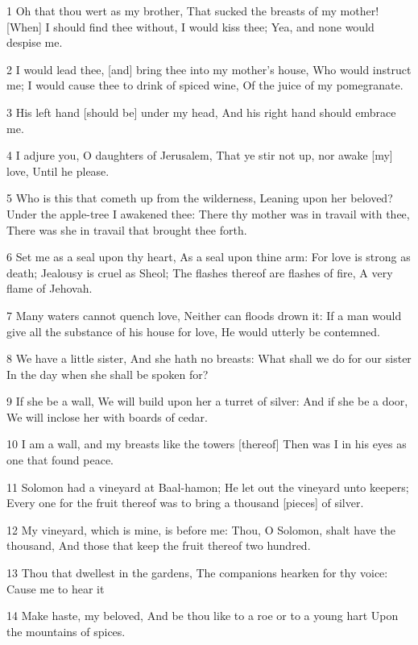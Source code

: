 \par 1 Oh that thou wert as my brother, That sucked the breasts of my mother! [When] I should find thee without, I would kiss thee; Yea, and none would despise me.
\par 2 I would lead thee, [and] bring thee into my mother's house, Who would instruct me; I would cause thee to drink of spiced wine, Of the juice of my pomegranate.
\par 3 His left hand [should be] under my head, And his right hand should embrace me.
\par 4 I adjure you, O daughters of Jerusalem, That ye stir not up, nor awake [my] love, Until he please.
\par 5 Who is this that cometh up from the wilderness, Leaning upon her beloved? Under the apple-tree I awakened thee: There thy mother was in travail with thee, There was she in travail that brought thee forth.
\par 6 Set me as a seal upon thy heart, As a seal upon thine arm: For love is strong as death; Jealousy is cruel as Sheol; The flashes thereof are flashes of fire, A very flame of Jehovah.
\par 7 Many waters cannot quench love, Neither can floods drown it: If a man would give all the substance of his house for love, He would utterly be contemned.
\par 8 We have a little sister, And she hath no breasts: What shall we do for our sister In the day when she shall be spoken for?
\par 9 If she be a wall, We will build upon her a turret of silver: And if she be a door, We will inclose her with boards of cedar.
\par 10 I am a wall, and my breasts like the towers [thereof] Then was I in his eyes as one that found peace.
\par 11 Solomon had a vineyard at Baal-hamon; He let out the vineyard unto keepers; Every one for the fruit thereof was to bring a thousand [pieces] of silver.
\par 12 My vineyard, which is mine, is before me: Thou, O Solomon, shalt have the thousand, And those that keep the fruit thereof two hundred.
\par 13 Thou that dwellest in the gardens, The companions hearken for thy voice: Cause me to hear it
\par 14 Make haste, my beloved, And be thou like to a roe or to a young hart Upon the mountains of spices.

